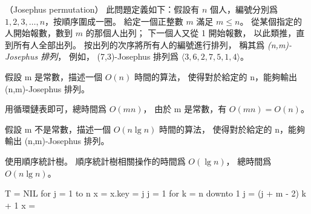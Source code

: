 \startPROBLEM
（Josephus permutation）
此問題定義如下：假設有 $n$ 個人，編號分別爲 $1,2,3,\ldots,n$，按順序圍成一圈。
給定一個正整數 $m$ 滿足 $m\le n$。
從某個指定的人開始報數，數到 $m$ 的那個人出列；
下一個人又從 1 開始報數，
以此類推，直到所有人全部出列。
按出列的次序將所有人的編號進行排列，
稱其爲 \emph{(n,m)-Josephus 排列}，
例如， (7,3)-Josephus 排列爲 $\langle 3,6,2,7,5,1,4\rangle$。

\startigBase[a]\startitem
假設 m 是常數，描述一個 $O(n)$ 時間的算法，
使得對於給定的 n，能夠輸出 (n,m)-Josephus 排列。
\stopitem\stopigBase

\startANSWER
用循環鏈表即可，總時間爲 $O(mn)$，
由於 m 是常數，有 $O(mn)=O(n)$。
\stopANSWER

\startigBase[continue]\startitem
假設 m 不是常數，描述一個 $O(n\lg n)$ 時間的算法，
使得對於給定的 n，能夠輸出 (n,m)-Josephus 排列。
\stopitem\stopigBase

\startANSWER
使用順序統計樹。
順序統計樹相關操作的時間爲 $O(\lg n)$，
總時間爲 $O(n\lg n)$。

\startCLRSCODE
T = NIL
for j = 1 to n
	x = 
	x.key = j
j = 1
for k = n downto 1
	j = (j + m - 2) \mod k + 1
	x = 
\stopCLRSCODE
\stopANSWER

\stopPROBLEM
